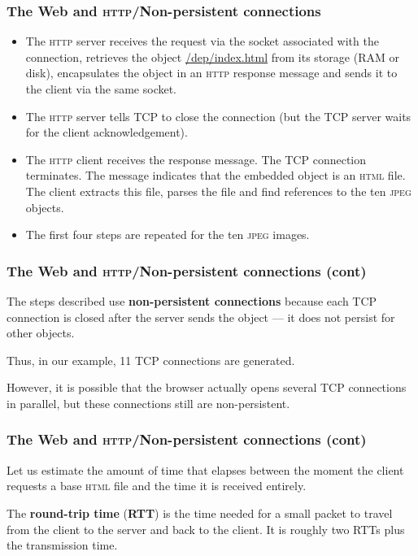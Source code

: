 %
\begin{frame}
\frametitle{The Web and \textsc{http}/Non-persistent connections}

\begin{itemize}

  \item The \textsc{http} server receives the request via the socket
    associated with the connection, retrieves the object
    \url{/dep/index.html} from its storage (RAM or disk), encapsulates
    the object in an \textsc{http} response message and sends it to
    the client via the same socket.

  \item The \textsc{http} server tells TCP to close the connection
    (but the TCP server waits for the client acknowledgement).

  \item The \textsc{http} client receives the response message. The
    TCP connection terminates. The message indicates that the
    embedded object is an \textsc{html} file. The client extracts this
    file, parses the file and find references to the ten \textsc{jpeg}
    objects.

 \item The first four steps are repeated for the ten \textsc{jpeg}
   images.

\end{itemize}

\end{frame}

%
\begin{frame}
\frametitle{The Web and \textsc{http}/Non-persistent connections (cont)}

The steps described use \textbf{non-persistent connections} because
each TCP connection is closed after the server sends the object --- it
does not persist for other objects.

\bigskip

Thus, in our example, 11 TCP connections are generated.

\bigskip

However, it is possible that the browser actually opens several TCP
connections in parallel, but these connections still are
non-persistent.

\end{frame}

%
\begin{frame}
\frametitle{The Web and \textsc{http}/Non-persistent connections (cont)}

Let us estimate the amount of time that elapses between the moment the
client requests a base \textsc{html} file and the time it is received
entirely.

\bigskip

The \textbf{round-trip time} (\textbf{RTT}) is the time needed for a
small packet to travel from the client to the server and back to the
client. It is roughly two RTTs plus the transmission time.

\end{frame}

